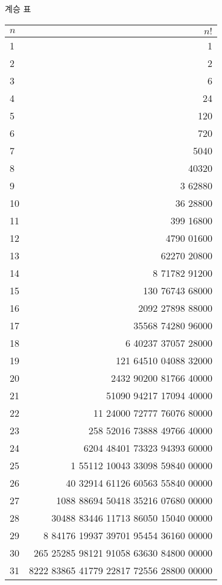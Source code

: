 \documentclass[10pt, a4paper]{article}
\begin{document}
\begin{center}
    \huge{계승 표}\normalsize\\
    \begin{longtable}{l | r}
        \(n\) & \(n!\)\\
        \hline\hline
        1 & 1 \\
        2 & 2 \\
        3 & 6 \\
        4 & 24 \\
        5 & 120 \\
        \hline
        6 & 720 \\
        7 & 5040 \\
        8 & 40320 \\
        9 & 3 62880 \\
        10 & 36 28800 \\
        \hline
        11 & 399 16800 \\
        12 & 4790 01600 \\
        13 & 62270 20800 \\
        14 & 8 71782 91200 \\
        15 & 130 76743 68000 \\
        \hline
        16 & 2092 27898 88000 \\
        17 & 35568 74280 96000 \\
        18 & 6 40237 37057 28000 \\
        19 & 121 64510 04088 32000 \\
        20 & 2432 90200 81766 40000 \\
        \hline
        21 & 51090 94217 17094 40000 \\
        22 & 11 24000 72777 76076 80000 \\
        23 & 258 52016 73888 49766 40000 \\
        24 & 6204 48401 73323 94393 60000 \\
        25 & 1 55112 10043 33098 59840 00000 \\
        \hline
        26 & 40 32914 61126 60563 55840 00000 \\
        27 & 1088 88694 50418 35216 07680 00000 \\
        28 & 30488 83446 11713 86050 15040 00000 \\
        29 & 8 84176 19937 39701 95454 36160 00000 \\
        30 & 265 25285 98121 91058 63630 84800 00000 \\
        \hline
        31 & 8222 83865 41779 22817 72556 28800 00000 \\

\end{longtable}
\end{center}
\end{document}

